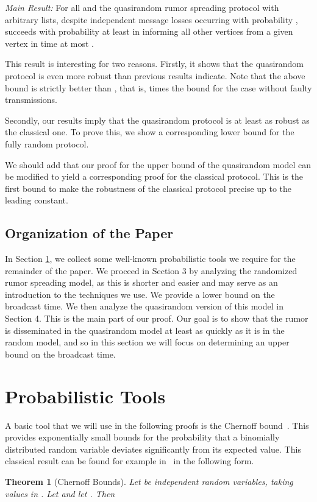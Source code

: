 \documentclass[12pt]{article}
\newtheorem{theorem}{Theorem}
\begin{document}
{\emph{Main Result:} For all  and  the quasirandom rumor spreading protocol with arbitrary lists, despite independent message losses occurring with probability , succeeds with probability at least  in  informing all other vertices from a given vertex in time at most .


This result is interesting for two reasons. Firstly, it shows that the quasirandom protocol is even more robust than previous results indicate. Note that the above bound is strictly better than , that is,  times the bound for the case without faulty transmissions.

Secondly, our results imply that the quasirandom protocol is at least as robust as the classical one. To prove this, we show a corresponding lower bound for the fully random protocol. 

We should add that our proof for the upper bound of the quasirandom model can be modified to yield a corresponding proof for the classical protocol. This is the first bound to make the robustness of the classical protocol precise up to the leading constant. 

\subsection{Organization of the Paper}
In Section \ref{sec:tools}, we collect some
well-known probabilistic tools we require for the remainder of the
paper. We proceed in Section 3 by analyzing the randomized rumor spreading model, as this is shorter and easier and may serve as an introduction to the techniques we use. We provide a lower bound on the broadcast time. We then analyze the quasirandom version of this model in Section 4. This is the main part of our proof. Our goal is to show that the rumor is disseminated in the quasirandom model at least as quickly as it is in the random model, and so in this section we will focus on determining an upper bound on the broadcast time.

\section{Probabilistic Tools}\label{sec:tools}
A basic tool that we will use in the following proofs is the Chernoff bound~\cite{Chernoff}. 
This provides exponentially small bounds for the probability that a binomially 
distributed random variable deviates significantly from its expected value. 
This classical result can be found for example in~\cite{MU05} in the following form.
\begin{theorem}[Chernoff Bounds]
\label{thm:chernoff}
Let  be independent random variables, taking
values in . Let  and let . Then 


\end{theorem}}
\end{document}
